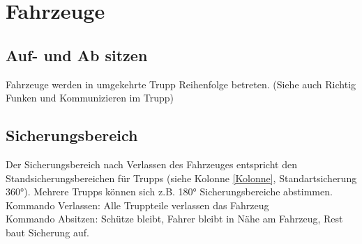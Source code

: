 \newpage
\section{Fahrzeuge}
\subsection{Auf- und Ab sitzen}
	Fahrzeuge werden in umgekehrte Trupp Reihenfolge betreten. (Siehe auch \glqq Richtig Funken und Kommunizieren im Trupp\grqq)
	
\subsection{Sicherungsbereich}
	Der Sicherungsbereich nach Verlassen des Fahrzeuges entspricht den Standsicherungsbereichen für  Trupps (siehe Kolonne \autoref{Kolonne}, Standartsicherung 360°). Mehrere Trupps können sich z.B. 180° Sicherungsbereiche abstimmen. \\
	Kommando Verlassen:  Alle Truppteile verlassen das Fahrzeug \\
	Kommando Absitzen: Schütze bleibt, Fahrer bleibt in Nähe am Fahrzeug, Rest baut Sicherung auf.\\
	
